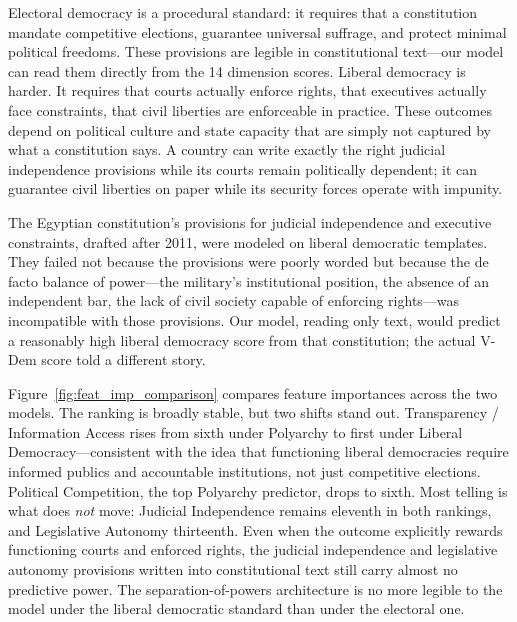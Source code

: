 \documentclass[9pt,twoside]{pnas-new}
\begin{document}
Electoral democracy is a procedural standard: it requires that a constitution mandate competitive elections, guarantee universal suffrage, and protect minimal political freedoms. These provisions are legible in constitutional text---our model can read them directly from the 14 dimension scores. Liberal democracy is harder. It requires that courts actually enforce rights, that executives actually face constraints, that civil liberties are enforceable in practice. These outcomes depend on political culture and state capacity that are simply not captured by what a constitution says. A country can write exactly the right judicial independence provisions while its courts remain politically dependent; it can guarantee civil liberties on paper while its security forces operate with impunity.

The Egyptian constitution's provisions for judicial independence and executive constraints, drafted after 2011, were modeled on liberal democratic templates. They failed not because the provisions were poorly worded but because the de facto balance of power---the military's institutional position, the absence of an independent bar, the lack of civil society capable of enforcing rights---was incompatible with those provisions. Our model, reading only text, would predict a reasonably high liberal democracy score from that constitution; the actual V-Dem score told a different story.

Figure~\ref{fig:feat_imp_comparison} compares feature importances across the two models. The ranking is broadly stable, but two shifts stand out. Transparency / Information Access rises from sixth under Polyarchy to first under Liberal Democracy---consistent with the idea that functioning liberal democracies require informed publics and accountable institutions, not just competitive elections. Political Competition, the top Polyarchy predictor, drops to sixth. Most telling is what does \emph{not} move: Judicial Independence remains eleventh in both rankings, and Legislative Autonomy thirteenth. Even when the outcome explicitly rewards functioning courts and enforced rights, the judicial independence and legislative autonomy provisions written into constitutional text still carry almost no predictive power. The separation-of-powers architecture is no more legible to the model under the liberal democratic standard than under the electoral one.
\end{document}

